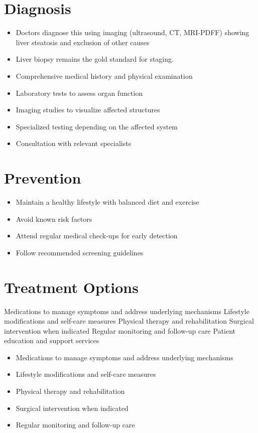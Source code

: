 \section{Diagnosis}
\begin{itemize}[noitemsep]
  \item Doctors diagnose this using imaging (ultrasound, CT, MRI-PDFF) showing liver steatosis and exclusion of other causes
  \item Liver biopsy remains the gold standard for staging.
  \item Comprehensive medical history and physical examination
  \item Laboratory tests to assess organ function
  \item Imaging studies to visualize affected structures
  \item Specialized testing depending on the affected system
  \item Consultation with relevant specialists
\end{itemize}
\section{Prevention}
\begin{itemize}[noitemsep]
  \item Maintain a healthy lifestyle with balanced diet and exercise
  \item Avoid known risk factors
  \item Attend regular medical check-ups for early detection
  \item Follow recommended screening guidelines
\end{itemize}
\section{Treatment Options}
Medications to manage symptoms and address underlying mechanisms Lifestyle modifications and self-care measures Physical therapy and rehabilitation Surgical intervention when indicated Regular monitoring and follow-up care Patient education and support services

\begin{itemize}[noitemsep]
  \item Medications to manage symptoms and address underlying mechanisms
  \item Lifestyle modifications and self-care measures
  \item Physical therapy and rehabilitation
  \item Surgical intervention when indicated
  \item Regular monitoring and follow-up care
\end{itemize}
